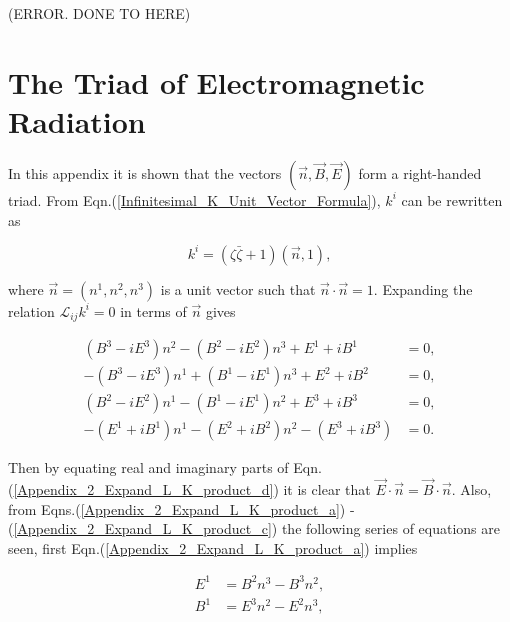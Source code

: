 \begin{appendix}
(ERROR. DONE TO HERE)


















\section{The Triad of Electromagnetic Radiation}\label{Appendix_Orthonormal_Triad}

In this appendix it is shown that the vectors $(\vec{n}, \vec{B}, \vec{E})$ form a right-handed triad. From Eqn.(\ref{Infinitesimal_K_Unit_Vector_Formula}), $k^i$ can be rewritten as

\begin{equation*}
k^i = (\zeta \bar{\zeta} + 1)(\vec{n}, 1),
\end{equation*}

\noindent where $\vec{n} = (n^1, n^2, n^3)$ is a unit vector such that $\vec{n} \cdot \vec{n} = 1$. Expanding the relation $\mathcal{L}_{ij} k^i = 0$ in terms of $\vec{n}$ gives

\begin{subequations}
\begin{align}
\label{Appendix_2_Expand_L_K_product_a}
(B^3 - i E^3)n^2 - (B^2 - i E^2)n^3 + E^1 + iB^1 & = 0, 
\\\label{Appendix_2_Expand_L_K_product_b}
-(B^3 - i E^3)n^1 + (B^1 - i E^1)n^3 + E^2 + iB^2 & = 0, 
\\\label{Appendix_2_Expand_L_K_product_c}
(B^2 - i E^2)n^1 - (B^1 - i E^1)n^2 + E^3 + iB^3 & = 0, 
\\\label{Appendix_2_Expand_L_K_product_d}
-(E^1 + i B^1)n^1 - (E^2 + iB^2)n^2 - (E^3 + iB^3) & = 0.
\end{align}
\end{subequations}

\noindent Then by equating real and imaginary parts of Eqn.(\ref{Appendix_2_Expand_L_K_product_d}) it is clear that  $\vec{E} \cdot \vec{n} = \vec{B} \cdot \vec{n}$. Also, from Eqns.(\ref{Appendix_2_Expand_L_K_product_a}) - (\ref{Appendix_2_Expand_L_K_product_c}) the following series of equations are seen, first Eqn.(\ref{Appendix_2_Expand_L_K_product_a}) implies

\begin{align*}
E^1 & = B^2 n^3 - B^3 n^2, \\
B^1 & = E^3 n^2 - E^2 n^3, 
\end{align*}


\end{appendix}
